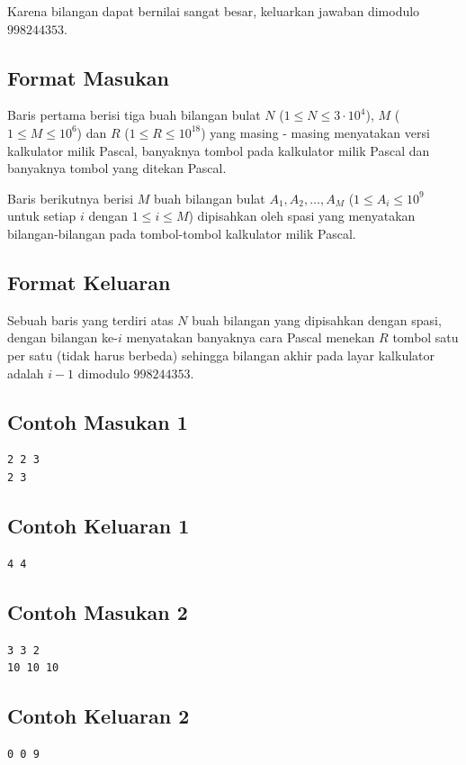 \documentclass{article}
\begin{document}
Karena bilangan dapat bernilai sangat besar, keluarkan jawaban dimodulo $998244353$.

\subsection*{Format Masukan}
Baris pertama berisi tiga buah bilangan bulat $N$ ($1 \le N \le 3 \cdot 10^4$), $M$ ($1 \le M \le 10^6$) dan $R$ ($1 \le R \le 10^{18}$) yang masing - masing menyatakan versi kalkulator milik Pascal, banyaknya tombol pada kalkulator milik Pascal dan banyaknya tombol yang ditekan Pascal.

Baris berikutnya berisi $M$ buah bilangan bulat $A_1, A_2, \dots, A_M$ ($1 \le A_i \le 10^9$ untuk setiap $i$ dengan $1 \leq i \leq M$) dipisahkan oleh spasi yang menyatakan bilangan-bilangan pada tombol-tombol kalkulator milik Pascal.

\subsection*{Format Keluaran}
Sebuah baris yang terdiri atas $N$ buah bilangan yang dipisahkan dengan spasi, dengan bilangan ke-$i$ menyatakan banyaknya cara Pascal menekan $R$ tombol satu per satu (tidak harus berbeda) sehingga bilangan akhir pada layar kalkulator adalah $i - 1$ dimodulo $998244353$.

\begin{multicols}{2}
\subsection*{Contoh Masukan 1}
\begin{lstlisting}
2 2 3
2 3
\end{lstlisting}
\columnbreak
\subsection*{Contoh Keluaran 1}
\begin{lstlisting}
4 4
\end{lstlisting}
\vfill
\null
\end{multicols}

\begin{multicols}{2}
\subsection*{Contoh Masukan 2}
\begin{lstlisting}
3 3 2
10 10 10
\end{lstlisting}
\columnbreak
\subsection*{Contoh Keluaran 2}
\begin{lstlisting}
0 0 9
\end{lstlisting}
\vfill
\null
\end{multicols}
\end{document}
